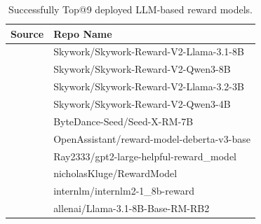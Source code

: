 \begin{table}[t]
    \centering
    \caption{Successfully Top@9 deployed LLM-based reward models.}
    \label{tab:llm-rm}
    \begin{tabular}{l|l}
    \hline
\textbf{Source} & \textbf{Repo Name} \\ \midrule
\citep{skyworkreward}   & Skywork/Skywork-Reward-V2-Llama-3.1-8B \\
\citep{skyworkreward}         & Skywork/Skywork-Reward-V2-Qwen3-8B \\
\citep{skyworkreward}         & Skywork/Skywork-Reward-V2-Llama-3.2-3B \\
\citep{skyworkreward}         & Skywork/Skywork-Reward-V2-Qwen3-4B \\
\citep{seedX} & ByteDance-Seed/Seed-X-RM-7B\\
                            & OpenAssistant/reward-model-deberta-v3-base \\
\citep{yang2024gpt2helpful}         & Ray2333/gpt2-large-helpful-reward\_model \\
\citep{nicholas22rewardreward}         & nicholasKluge/RewardModel \\
\citep{cai2024internlm2}         & internlm/internlm2-1\_8b-reward \\
\citep{malik2025rewardbench2advancingreward}         & allenai/Llama-3.1-8B-Base-RM-RB2 \\ \bottomrule
    \end{tabular}
\end{table}


